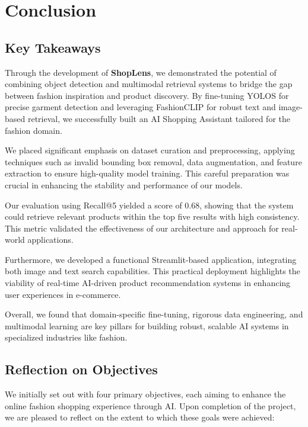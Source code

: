 \chapter{Conclusion}
\label{chap:conclusion}

\section{Key Takeaways}

Through the development of \textbf{ShopLens}, we demonstrated the potential of combining object detection and multimodal retrieval systems to bridge the gap between fashion inspiration and product discovery. By fine-tuning YOLOS for precise garment detection and leveraging FashionCLIP for robust text and image-based retrieval, we successfully built an AI Shopping Assistant tailored for the fashion domain.

We placed significant emphasis on dataset curation and preprocessing, applying techniques such as invalid bounding box removal, data augmentation, and feature extraction to ensure high-quality model training. This careful preparation was crucial in enhancing the stability and performance of our models.

Our evaluation using Recall@5 yielded a score of 0.68, showing that the system could retrieve relevant products within the top five results with high consistency. This metric validated the effectiveness of our architecture and approach for real-world applications.

Furthermore, we developed a functional Streamlit-based application, integrating both image and text search capabilities. This practical deployment highlights the viability of real-time AI-driven product recommendation systems in enhancing user experiences in e-commerce.

Overall, we found that domain-specific fine-tuning, rigorous data engineering, and multimodal learning are key pillars for building robust, scalable AI systems in specialized industries like fashion.

\section{Reflection on Objectives}

We initially set out with four primary objectives, each aiming to enhance the online fashion shopping experience through AI. Upon completion of the project, we are pleased to reflect on the extent to which these goals were achieved:

